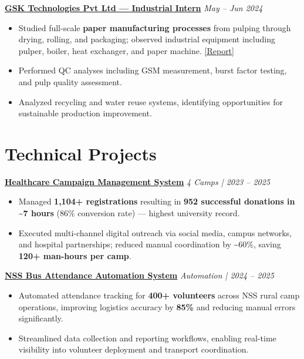 \documentclass[10pt, a4paper]{article}
\newcommand{\roleentry}[2]{%
  \textbf{#1} \hfill \textit{#2}%
}
\newenvironment{rlist}{%
  \begin{itemize}[
    leftmargin=1.4em,
    itemsep=1.5pt,
    parsep=0pt,
    topsep=2pt,
    label=\textcolor{accentNavy}{\textbullet}
  ]
}{\end{itemize}}
\begin{document}
\vspace{4pt}

\roleentry{\href{https://drive.google.com/file/d/13HT-oCZhkRE40P0Xaie-KjWmlaepJYsK/view?usp=sharing}{GSK Technologies Pvt Ltd --- Industrial Intern}}{May -- Jun 2024}
\begin{rlist}
  \item Studied full-scale \textbf{paper manufacturing processes} from pulping through drying, rolling, and packaging; observed industrial equipment including pulper, boiler, heat exchanger, and paper machine. \href{https://drive.google.com/file/d/1drIGDmz9P0_0Jr45Ti9BIvV-h2sytori/view?usp=sharing}{[Report]}
  \item Performed QC analyses including GSM measurement, burst factor testing, and pulp quality assessment.
  \item Analyzed recycling and water reuse systems, identifying opportunities for sustainable production improvement.
\end{rlist}

\section{Technical Projects}

\roleentry{\href{https://script.google.com/macros/s/AKfycbxI4WpnQ9l0H2sDxxvESYR3J99xpgczwNWquQhBUZhTl8hZ5MvWKrsGF2YdcpD6ZImz/exec}{Healthcare Campaign Management System}}{4 Camps | 2023 -- 2025}
\begin{rlist}
  \item Managed \textbf{1,104+ registrations} resulting in \textbf{952 successful donations in \textasciitilde7 hours} (86\% conversion rate) --- highest university record.
  \item Executed multi-channel digital outreach via social media, campus networks, and hospital partnerships; reduced manual coordination by \textasciitilde60\%, saving \textbf{120+ man-hours per camp}.
\end{rlist}

\vspace{4pt}

\roleentry{\href{https://script.google.com/macros/s/AKfycbwn6Hqel1xO8aTFXhhFItg2uLau7kdGsbs28diJVQbumvcRENQZ3F9nPTN7pXO1rx7t4A/exec}{NSS Bus Attendance Automation System}}{Automation | 2024 -- 2025}
\begin{rlist}
  \item Automated attendance tracking for \textbf{400+ volunteers} across NSS rural camp operations, improving logistics accuracy by \textbf{85\%} and reducing manual errors significantly.
  \item Streamlined data collection and reporting workflows, enabling real-time visibility into volunteer deployment and transport coordination.
\end{rlist}
\end{document}
